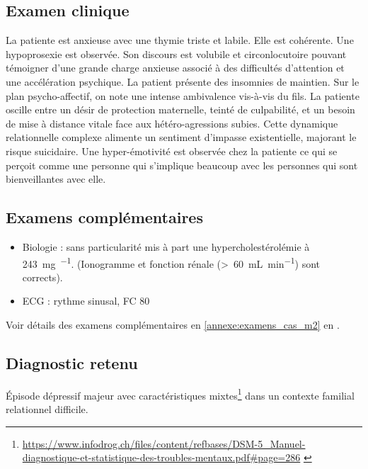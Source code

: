 \subsection{Examen clinique}
La patiente est anxieuse avec une thymie triste et labile.
Elle est cohérente. Une hypoprosexie est observée. 
Son discours est volubile et circonlocutoire pouvant témoigner d’une grande charge anxieuse associé à des difficultés d’attention et une accélération psychique. 
La patient présente des insomnies de maintien. 
Sur le plan psycho-affectif, on note une intense ambivalence vis-à-vis du fils. 
La patiente oscille entre un désir de protection maternelle, teinté de culpabilité, et un besoin de mise à distance vitale face aux hétéro-agressions subies. Cette dynamique relationnelle complexe alimente un sentiment d'impasse existentielle, majorant le risque suicidaire. 
Une hyper-émotivité est observée chez la patiente ce qui se perçoit comme une personne qui s’implique beaucoup avec les personnes qui sont bienveillantes avec elle. 

\subsection{Examens complémentaires}
\begin{itemize}[compact, label=\textbullet]
    \item Biologie : sans particularité mis à part une hypercholestérolémie à \qty{243}{\mg\per\dL}. (Ionogramme et fonction rénale (>~\qty{60}{\mL\per\minute}) sont corrects).
    \item ECG : rythme sinusal, FC \qty{80}{\bpm}
\end{itemize}
\leavevmode{}\label{retour:examens_cas_iii}Voir détails des examens complémentaires en \cref{annexe:examens_cas_m2} en .

\subsection{Diagnostic retenu}
 
Épisode dépressif majeur avec caractéristiques mixtes\footnote{\url{https://www.infodrog.ch/files/content/refbases/DSM-5_Manuel-diagnostique-et-statistique-des-troubles-mentaux.pdf\#page=286} \parencite{dsm5_online}}  dans un contexte familial relationnel difficile.

